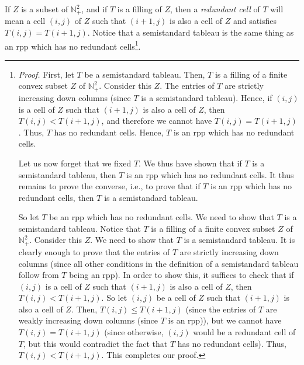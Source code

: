 \documentclass[numbers=enddot,12pt,final,onecolumn,notitlepage]{scrartcl}%
\theoremstyle{definition}
\newenvironment{verlong}{}{}
\begin{document}
\begin{verlong}
If $Z$ is a subset of $\mathbb{N}_{+}^{2}$, and if $T$ is a filling of $Z$,
then a \textit{redundant cell} of $T$ will mean a cell $\left(  i,j\right)  $
of $Z$ such that $\left(  i+1,j\right)  $ is also a cell of $Z$ and satisfies
$T\left(  i,j\right)  =T\left(  i+1,j\right)  $. Notice that a semistandard
tableau is the same thing as an rpp which has no redundant
cells\footnote{\textit{Proof.} First, let $T$ be a semistandard tableau. Then,
$T$ is a filling of a finite convex subset $Z$ of $\mathbb{N}_{+}^{2}$.
Consider this $Z$. The entries of $T$ are strictly increasing down columns
(since $T$ is a semistandard tableau). Hence, if $\left(  i,j\right)  $ is a
cell of $Z$ such that $\left(  i+1,j\right)  $ is also a cell of $Z$, then
$T\left(  i,j\right)  <T\left(  i+1,j\right)  $, and therefore we cannot have
$T\left(  i,j\right)  =T\left(  i+1,j\right)  $. Thus, $T$ has no redundant
cells. Hence, $T$ is an rpp which has no redundant cells.
\par
Let us now forget that we fixed $T$. We thus have shown that if $T$ is a
semistandard tableau, then $T$ is an rpp which has no redundant cells. It thus
remains to prove the converse, i.e., to prove that if $T$ is an rpp which has
no redundant cells, then $T$ is a semistandard tableau.
\par
So let $T$ be an rpp which has no redundant cells. We need to show that $T$ is
a semistandard tableau. Notice that $T$ is a filling of a finite convex subset
$Z$ of $\mathbb{N}_{+}^{2}$. Consider this $Z$. We need to show that $T$ is a
semistandard tableau. It is clearly enough to prove that the entries of $T$
are strictly increasing down columns (since all other conditions in the
definition of a semistandard tableau follow from $T$ being an rpp). In order
to show this, it suffices to check that if $\left(  i,j\right)  $ is a cell of
$Z$ such that $\left(  i+1,j\right)  $ is also a cell of $Z$, then $T\left(
i,j\right)  <T\left(  i+1,j\right)  $. So let $\left(  i,j\right)  $ be a cell
of $Z$ such that $\left(  i+1,j\right)  $ is also a cell of $Z$. Then,
$T\left(  i,j\right)  \leq T\left(  i+1,j\right)  $ (since the entries of $T$
are weakly increasing down columns (since $T$ is an rpp)), but we cannot have
$T\left(  i,j\right)  =T\left(  i+1,j\right)  $ (since otherwise, $\left(
i,j\right)  $ would be a redundant cell of $T$, but this would contradict the
fact that $T$ has no redundant cells). Thus, $T\left(  i,j\right)  <T\left(
i+1,j\right)  $. This completes our proof.}.
\end{verlong}
\end{document}
